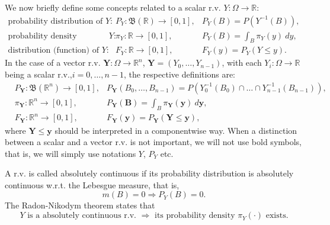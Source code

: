 We now briefly define some concepts related to a scalar r.v. $Y:\Omega\rightarrow\mathbb{R}$:
\begin{eqnarray*}
\mbox{probability distribution of }                      Y: & P_Y:  \mathfrak{B}(\mathbb{R})\rightarrow [0,1], & P_Y(B) = P(Y^{-1}(B)),       \\
\mbox{probability density (function), if it exists, of } Y: & \pi_Y:             \mathbb{R} \rightarrow [0,1], & P_Y(B) = \int_B \pi_Y(y)~dy, \\
\mbox{distribution (function) of }                       Y: & F_Y:               \mathbb{R} \rightarrow [0,1], & F_Y(y) = P_Y(Y\leqslant y).
\end{eqnarray*}
In the case of a vector r.v. $\mathbf{Y}:\Omega\rightarrow\mathbb{R}^n$, $\mathbf{Y}=(Y_0,\ldots,Y_{n-1})$,
with each $Y_i:\Omega\rightarrow\mathbb{R}$ being a scalar r.v.,$i=0,\ldots,n-1$, the respective definitions are:
\begin{eqnarray*}
 & P_{\mathbf{Y}}:  \mathfrak{B}(\mathbb{R}^n)\rightarrow [0,1], & P_{\mathbf{Y}}(B_0,\ldots,B_{n-1}) = P(Y_0^{-1}(B_0)\cap\ldots\cap Y_{n-1}^{-1}(B_{n-1})), \\
 & \pi_{\mathbf{Y}}:             \mathbb{R}^n \rightarrow [0,1], & P_{\mathbf{Y}}(\mathbf{B}) = \int_B \pi_{\mathbf{Y}}(\mathbf{y})~d\mathbf{y}, \\
 & F_{\mathbf{Y}}:               \mathbb{R}^n \rightarrow [0,1], & F_{\mathbf{Y}}(\mathbf{y}) = P_{\mathbf{Y}}(\mathbf{Y}\leqslant\mathbf{y}),
\end{eqnarray*}
where $\mathbf{Y}\leqslant\mathbf{y}$ should be interpreted in a componentwise way.
When a distinction between a scalar and a vector r.v. is not important, we will not use bold symbols, that is, we will simply use notations $Y$, $P_Y$ etc.

A r.v. is called absolutely continuous if its probability distribution is absolutely continuous w.r.t. the Lebesgue measure, that is,
\begin{equation*}
m(B) = 0 \Rightarrow P_Y(B) = 0.
\end{equation*}
The Radon-Nikodym theorem \cite{KaSo05} states that
\begin{equation}\label{eq-radon-nik}
Y\mbox{ is a absolutely continuous r.v. }\Rightarrow\mbox{ its probability density }\pi_Y(\cdot)\mbox{ exists}.
\end{equation}

